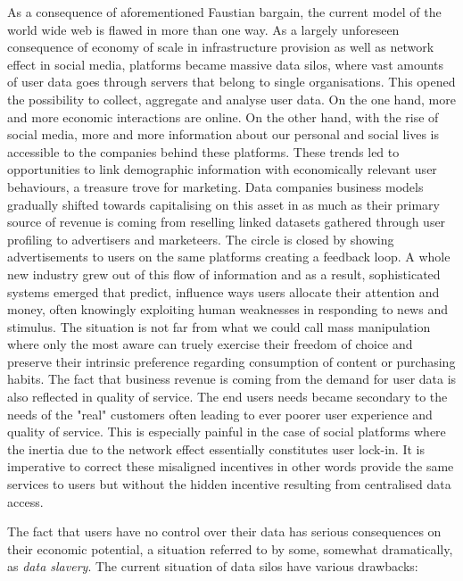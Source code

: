 As a consequence of aforementioned Faustian bargain, the current model of the world wide web is flawed in more than one way.
 As a largely unforeseen consequence of economy of scale in infrastructure provision as well as network effect in social media, platforms became massive data silos, where vast amounts of user data goes through servers that belong to single organisations. This opened the possibility to collect, aggregate and analyse user data. 
On the one hand, more and more economic interactions are online. On the other hand, with the rise of social media, more and more information about our personal and social lives is accessible to the companies behind these platforms. These trends led to opportunities to link demographic information with economically relevant user behaviours, a treasure trove for marketing.
Data companies business models gradually shifted towards capitalising on this asset in as much as their primary source of revenue is coming from reselling linked datasets gathered through user profiling to advertisers and marketeers. The circle is closed by showing advertisements to users on the same platforms creating a feedback loop. A whole new industry grew out of this flow of information and as  a result, sophisticated systems emerged that predict, influence ways users allocate their attention and money, often knowingly exploiting human weaknesses in responding to news and stimulus. The situation is not far from what we could call mass manipulation where only the most aware can truely exercise their freedom of choice and preserve their intrinsic preference regarding consumption of content or purchasing habits.
The fact that business revenue is coming from the demand for user data is also reflected in quality of service. The end users needs became secondary to the needs of the "real" customers often leading to ever poorer user experience and quality of service. This is especially painful in the case of social platforms where the inertia due to the network effect essentially constitutes user lock-in. It is imperative to correct these misaligned incentives in other words provide the same services to users but without the hidden incentive resulting from centralised data  access.

The fact that users have no control over their data has serious consequences on their economic potential, a situation  referred to by some, somewhat dramatically, as \emph{data slavery}. 
The current situation of data silos have various drawbacks: 

